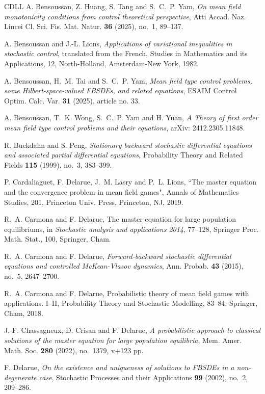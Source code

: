 \documentclass[11pt]{article}
\numberwithin{equation}{section}
\newcommand{\1}{\mbox{1\hspace{-1mm}I}}
\begin{document}
\begin{thebibliography}{CDLL}
 A. Bensoussan, Z. Huang, S. Tang and S.~C.~P. Yam, \textit{On mean field monotonicity conditions from control theoretical perspective}, Atti Accad. Naz. Lincei Cl. Sci. Fis. Mat. Natur. \textbf{36} (2025), no.~1, 89--137.

 A. Bensoussan and J.-L. Lions, {\it Applications of variational inequalities in stochastic control}, translated from the French, Studies in Mathematics and its Applications, 12, North-Holland, Amsterdam-New York, 1982.

 A. Bensoussan, H.~M. Tai and S.~C.~P. Yam, \textit{Mean field type control problems, some Hilbert-space-valued FBSDEs, and related equations}, ESAIM Control Optim. Calc. Var. \textbf{31} (2025), article no. 33.

 A. Bensoussan, T.~K. Wong, S.~C.~P. Yam and H. Yuan, \textit{A Theory of first order mean field type control problems and their equations}, arXiv: 2412.2305.11848.

 R. Buckdahn and S. Peng, \textit{Stationary backward stochastic differential equations and associated partial differential equations}, Probability Theory and Related Fields \textbf{115} (1999), no.~3, 383--399.

 P. Cardaliaguet, F. Delarue, J.~M. Lasry and P.~L. Lions,  ``The master equation and the convergence problem in mean field games", Annals of Mathematics Studies, 201, Princeton Univ. Press, Princeton, NJ, 2019. %

 R.~A. Carmona and F. Delarue, The master equation for large population equilibriums, in {\it Stochastic analysis and applications 2014}, 77--128, Springer Proc. Math. Stat., 100, Springer, Cham.

 R.~A. Carmona and F. Delarue, \textit{Forward-backward stochastic differential equations and controlled McKean-Vlasov dynamics}, Ann. Probab. \textbf{43} (2015), no.~5, 2647--2700. %

 R.~A. Carmona and F. Delarue, {Probabilistic theory of mean field games with applications. I--II}, Probability Theory and Stochastic Modelling, 83--84, Springer, Cham, 2018. %

 J.-F. Chassagneux, D. Crisan and F. Delarue, \textit{A probabilistic approach to classical solutions of the master equation for large population equilibria}, Mem. Amer. Math. Soc. \textbf{280} (2022), no.~1379, v+123 pp.

 F. Delarue, \textit{On the existence and uniqueness of solutions to FBSDEs in a non-degenerate case}, Stochastic Processes and their Applications \textbf{99} (2002), no.~2, 209--286.


\end{thebibliography}
\end{document}
